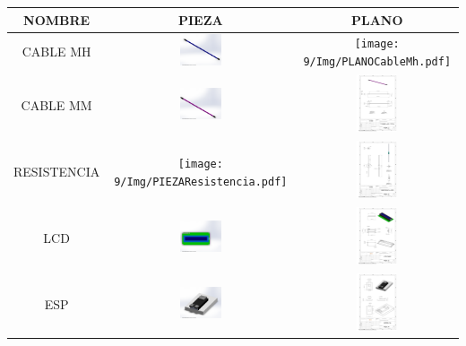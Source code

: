     \begin{table}[H]
    
        \huge
        \tiny
        \begin{tabular}{|c|c|c|}
        
        \hline
        NOMBRE & PIEZA & PLANO\\
        \hline
        CABLE MH & \includegraphics[width=12mm]{9/Img/PIEZACableMH.PDF} & \texttt{[image: 9/Img/PLANOCableMh.pdf]}\\
        \hline
        CABLE MM & \includegraphics[width=12mm]{9/Img/PIEZACableMM.PDF} & \includegraphics[width=12mm]{9/Img/PLANOCableMm.pdf}\\
        \hline
        RESISTENCIA &\texttt{[image: 9/Img/PIEZAResistencia.pdf]} & \includegraphics[width=12mm]{9/Img/PLANOResistencia.pdf}\\
        \hline
        LCD &  \includegraphics[width=12mm]{9/Img/PIEZALcd.pdf} & \includegraphics[width=12mm]{9/Img/PLANOLcd.PDF}\\
        \hline
        ESP & \includegraphics[width=12mm]{9/Img/PIEZAEsp32.pdf} & \includegraphics[width=12mm]{9/Img/PLANOEsp32.PDF}\\

\end{tabular}
\end{table}
